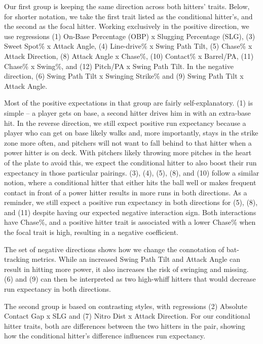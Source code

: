\documentclass{article}
\begin{document}
Our first group is keeping the same direction across both hitters' traits. Below, for shorter notation, we take the first trait listed as the conditional hitter's, and the second as the focal hitter. Working exclusively in the positive direction, we use regressions (1) On-Base Percentage (OBP) x Slugging Percentage (SLG), (3) Sweet Spot\% x Attack Angle, (4) Line-drive\% x Swing Path Tilt, (5) Chase\% x Attack Direction, (8) Attack Angle x Chase\%, (10) Contact\% x Barrel/PA, (11) Chase\% x Swing\%, and (12) Pitch/PA x Swing Path Tilt. In the negative direction, (6) Swing Path Tilt x Swinging Strike\% and (9) Swing Path Tilt x Attack Angle.

Most of the positive expectations in that group are fairly self-explanatory. (1) is simple -- a player gets on base, a second hitter drives him in with an extra-base hit. In the reverse direction, we still expect positive run expectancy because a player who can get on base likely walks and, more importantly, stays in the strike zone more often, and pitchers will not want to fall behind to that hitter when a power hitter is on deck. With pitchers likely throwing more pitches in the heart of the plate to avoid this, we expect the conditional hitter to also boost their run expectancy in those particular pairings. (3), (4), (5), (8), and (10) follow a similar notion, where a conditional hitter that either hits the ball well or makes frequent contact in front of a power hitter results in more runs in both directions. As a reminder, we still expect a positive run expectancy in both directions for (5), (8), and (11) despite having our expected negative interaction sign. Both interactions have Chase\%, and a positive hitter trait is associated with a lower Chase\% when the focal trait is high, resulting in a negative coefficient.

The set of negative directions shows how we change the connotation of bat-tracking metrics. While an increased Swing Path Tilt and Attack Angle can result in hitting more power, it also increases the risk of swinging and missing. (6) and (9) can then be interpreted as two high-whiff hitters that would decrease run expectancy in both directions.

The second group is based on contrasting styles, with regressions (2) Absolute Contact Gap x SLG and (7) Nitro Dist x Attack Direction. For our conditional hitter traits, both are differences between the two hitters in the pair, showing how the conditional hitter's difference influences run expectancy.
\end{document}
